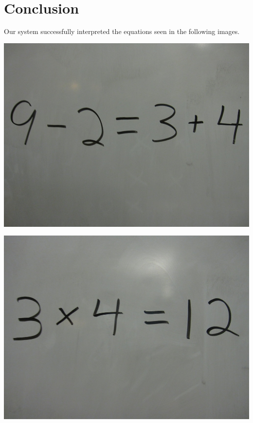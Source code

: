 \section{Conclusion}

Our system successfully interpreted the equations seen in the following images.

\begin{minipage}[h!]{.9\linewidth}%
\begin{minipage}[h!]{0.49\textwidth}%
\includegraphics[width=\textwidth]{images/img_001.jpg}
\end{minipage}
\begin{minipage}[h!]{0.49\textwidth}%
\includegraphics[width=\linewidth]{images/img_002.jpg}

\end{minipage}
\end{minipage}
